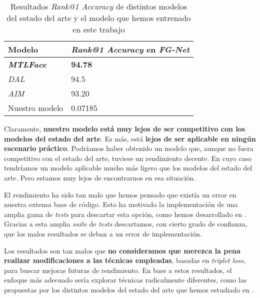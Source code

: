 \begin{table}[!hbtp]
\centering
\begin{tabular}{|l|l|}
    \hline
    Modelo                    & \textit{Rank@1 Accuracy} en \textit{FG-Net} \\
    \hline

    \textbf{\textit{MTLFace}} & \textbf{94.78}                              \\
    \textit{DAL}              & 94.5                                        \\
    \textit{AIM}              & 93.20                                       \\
    Nuestro modelo            & 0.07185                                     \\
    \hline

\end{tabular}
\caption{Resultados \textit{Rank@1 Accuracy} de distintos modelos del estado del arte y el modelo que hemos entrenado en este trabajo}
\label{table:estado_del_arte_y_mi_modelo}
\end{table}

Claramente, \textbf{nuestro modelo está muy lejos de ser competitivo con los modelos del estado del arte}. Es más, está \textbf{lejos de ser aplicable en ningún escenario práctico}. Podríamos haber obtenido un modelo que, aunque no fuera competitivo con el estado del arte, tuviese un rendimiento decente. En cuyo caso tendríamos un modelo aplicable mucho más ligero que los modelos del estado del arte. Pero estamos muy lejos de encontrarnos en esa situación.

El rendimiento ha sido tan malo que hemos pensado que existía un error en nuestra extensa base de código. Esto ha motivado la implementación de una amplia gama de \textit{tests} para descartar esta opción, como hemos desarrollado en . Gracias a esta amplia \textit{suite} de \textit{tests} descartamos, con cierto grado de confianza, que los malos resultados se deban a un error de implementación.

Los resultados son tan malos que \textbf{no consideramos que merezca la pena realizar modificaciones a las técnicas empleadas}, basadas en \textit{triplet loss}, para buscar mejoras futuras de rendimiento. En base a estos resultados, el enfoque más adecuado sería explorar técnicas radicalmente diferentes, como las propuestas por los distintos modelos del estado del arte que hemos estudiado en .
